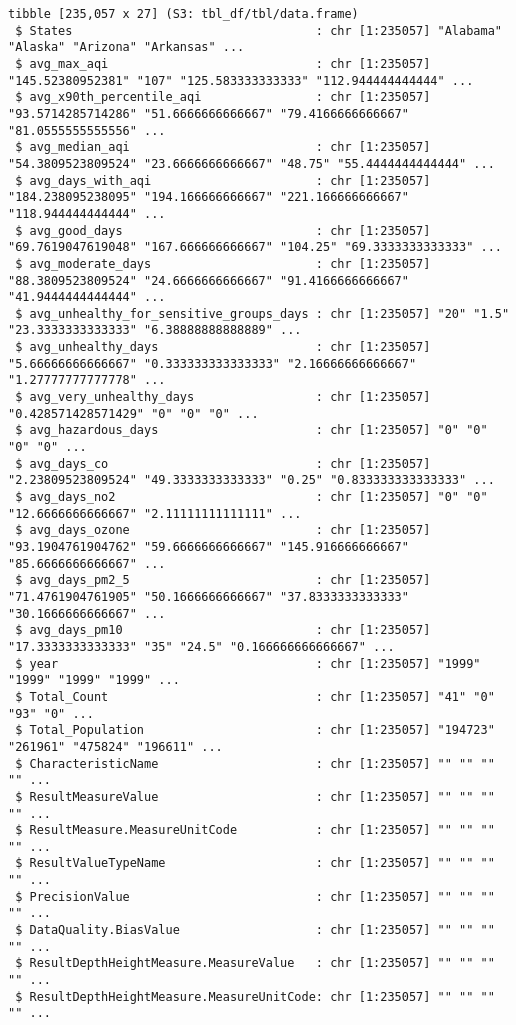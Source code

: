 \documentclass[
  12pt,
]{article}
\begin{document}
\begin{verbatim}
tibble [235,057 x 27] (S3: tbl_df/tbl/data.frame)
 $ States                                  : chr [1:235057] "Alabama" "Alaska" "Arizona" "Arkansas" ...
 $ avg_max_aqi                             : chr [1:235057] "145.52380952381" "107" "125.583333333333" "112.944444444444" ...
 $ avg_x90th_percentile_aqi                : chr [1:235057] "93.5714285714286" "51.6666666666667" "79.4166666666667" "81.0555555555556" ...
 $ avg_median_aqi                          : chr [1:235057] "54.3809523809524" "23.6666666666667" "48.75" "55.4444444444444" ...
 $ avg_days_with_aqi                       : chr [1:235057] "184.238095238095" "194.166666666667" "221.166666666667" "118.944444444444" ...
 $ avg_good_days                           : chr [1:235057] "69.7619047619048" "167.666666666667" "104.25" "69.3333333333333" ...
 $ avg_moderate_days                       : chr [1:235057] "88.3809523809524" "24.6666666666667" "91.4166666666667" "41.9444444444444" ...
 $ avg_unhealthy_for_sensitive_groups_days : chr [1:235057] "20" "1.5" "23.3333333333333" "6.38888888888889" ...
 $ avg_unhealthy_days                      : chr [1:235057] "5.66666666666667" "0.333333333333333" "2.16666666666667" "1.27777777777778" ...
 $ avg_very_unhealthy_days                 : chr [1:235057] "0.428571428571429" "0" "0" "0" ...
 $ avg_hazardous_days                      : chr [1:235057] "0" "0" "0" "0" ...
 $ avg_days_co                             : chr [1:235057] "2.23809523809524" "49.3333333333333" "0.25" "0.833333333333333" ...
 $ avg_days_no2                            : chr [1:235057] "0" "0" "12.6666666666667" "2.11111111111111" ...
 $ avg_days_ozone                          : chr [1:235057] "93.1904761904762" "59.6666666666667" "145.916666666667" "85.6666666666667" ...
 $ avg_days_pm2_5                          : chr [1:235057] "71.4761904761905" "50.1666666666667" "37.8333333333333" "30.1666666666667" ...
 $ avg_days_pm10                           : chr [1:235057] "17.3333333333333" "35" "24.5" "0.166666666666667" ...
 $ year                                    : chr [1:235057] "1999" "1999" "1999" "1999" ...
 $ Total_Count                             : chr [1:235057] "41" "0" "93" "0" ...
 $ Total_Population                        : chr [1:235057] "194723" "261961" "475824" "196611" ...
 $ CharacteristicName                      : chr [1:235057] "" "" "" "" ...
 $ ResultMeasureValue                      : chr [1:235057] "" "" "" "" ...
 $ ResultMeasure.MeasureUnitCode           : chr [1:235057] "" "" "" "" ...
 $ ResultValueTypeName                     : chr [1:235057] "" "" "" "" ...
 $ PrecisionValue                          : chr [1:235057] "" "" "" "" ...
 $ DataQuality.BiasValue                   : chr [1:235057] "" "" "" "" ...
 $ ResultDepthHeightMeasure.MeasureValue   : chr [1:235057] "" "" "" "" ...
 $ ResultDepthHeightMeasure.MeasureUnitCode: chr [1:235057] "" "" "" "" ...
\end{verbatim}
\end{document}

